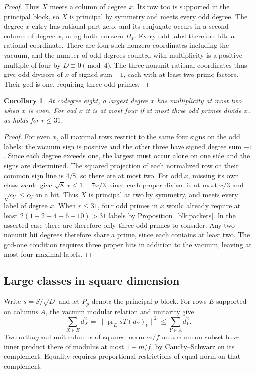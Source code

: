 \documentclass[11pt]{amsart}
\numberwithin{equation}{section}
\newtheorem{corollary}[theorem]{Corollary}
\begin{document}
\begin{proof}
Thus $X$ meets a column of degree $x$. Its row too is supported in the
principal block, so $X$ is principal by symmetry and meets every odd
degree. The degree-$x$ entry has rational part zero, and its conjugate
occurs in a second column of degree $x$, using both nonzero $B_Y$.
Every odd label therefore hits a rational coordinate. There are four
such nonzero coordinates including the vacuum, and the number of odd
degrees counted with multiplicity is a positive multiple of four by
$D\equiv0\pmod4$. The three nonunit rational coordinates thus give odd
divisors of $x$ of signed sum $-1$, each with at least two prime
factors. Their gcd is one, requiring three odd primes.
\end{proof}


\begin{corollary}
At codegree eight, a largest degree $x$ has multiplicity at most two
when $x$ is even. For odd $x$ it is at most four if at most three odd
primes divide $x$, as holds for $r\le31$.
\end{corollary}
\begin{proof}
For even $x$, all maximal rows restrict to the same four signs on the odd labels: the vacuum sign is positive and the other three have signed degree sum $-1$. Since each degree exceeds one, the largest must occur alone on one side and the signs are determined. The squared projection of each normalized row on their common sign line is $4/8$, so there are at most two. For odd $x$, missing its own class would give $\sqrt8\,x\le1+7x/3$, since each proper divisor is at most $x/3$ and $\sqrt{c_Y}\le c_Y$ on a hit. Thus $X$ is principal at two by symmetry, and meets every label of degree $x$. When $r\le31$, four odd primes in $x$ would already require at least $2(1+2+4+6+10)>31$ labels by Proposition~\ref{blk:packets}. In the asserted case there are therefore only three odd primes to consider. Any two nonunit hit degrees therefore share a prime, since each contains at least two. The gcd-one condition requires three proper hits in addition to the vacuum, leaving at most four maximal labels.
\end{proof}

\subsection{Large classes in square dimension}
Write $s=S/\sqrt D$ and let $P_p$ denote the principal $p$-block. For rows $E$ supported on columns $A$, the vacuum modular relation and unitarity give
\begin{equation}\label{sq:mass}
 \sum_{X\in E}d_X^2=\|\operatorname{pr}_E sT(d_Y)_Y\|^2
       \le\sum_{Y\in A}d_Y^2.
\end{equation}
Two orthogonal unit columns of squared norm $m/f$ on a common subset have inner product there of modulus at most $1-m/f$, by Cauchy--Schwarz on its complement. Equality requires proportional restrictions of equal norm on that complement.
\end{document}
